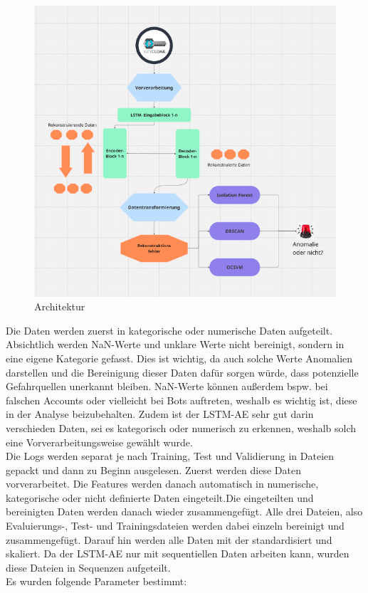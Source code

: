 \documentclass[a4paper,12pt]{article}
\begin{document}
	\begin{figure}[H]
		\centering
		\includegraphics[width=0.7\linewidth]{screenshot001}
		\caption{Architektur}
		\label{fig:screenshot001}
	\end{figure}
	
	Die Daten werden zuerst in kategorische oder numerische Daten aufgeteilt. Absichtlich werden NaN-Werte und unklare Werte nicht bereinigt, sondern in eine eigene Kategorie gefasst. Dies ist wichtig, da auch solche Werte Anomalien darstellen und die Bereinigung dieser Daten dafür sorgen würde, dass potenzielle Gefahrquellen unerkannt bleiben. NaN-Werte können außerdem bspw. bei falschen Accounts oder vielleicht bei Bots auftreten, weshalb es wichtig ist, diese in der Analyse beizubehalten. Zudem ist der LSTM-AE sehr gut darin verschieden Daten, sei es kategorisch oder numerisch zu erkennen, weshalb solch eine Vorverarbeitungsweise gewählt wurde.
	\\[0.5em]
	Die Logs werden separat je nach Training, Test und Validierung in Dateien gepackt und dann zu Beginn ausgelesen. Zuerst werden diese Daten vorverarbeitet. Die Features werden danach automatisch in numerische, kategorische oder nicht definierte Daten eingeteilt.Die eingeteilten und bereinigten Daten werden danach wieder zusammengefügt. Alle drei Dateien, also Evaluierungs-, Test- und Trainingsdateien werden dabei einzeln bereinigt und zusammengefügt. Darauf hin werden alle Daten mit der standardisiert und skaliert. Da der LSTM-AE nur mit sequentiellen Daten arbeiten kann, wurden diese Dateien in Sequenzen aufgeteilt.
	\\[0.5em]
	Es wurden folgende Parameter bestimmt:
	
\end{document}
